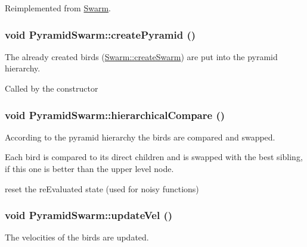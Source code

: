 Reimplemented from \hyperlink{classSwarm_4f31a2aeda867e79eab25b1a108f1c6f}{Swarm}.\hypertarget{classPyramidSwarm_23f4681fcd5ba0151ee4abc7c0143889}{
\subsubsection{\setlength{\rightskip}{0pt plus 5cm}void PyramidSwarm::createPyramid ()}}
\label{classPyramidSwarm_23f4681fcd5ba0151ee4abc7c0143889}


The already created birds (\hyperlink{classSwarm_1ba247983a6f20d0e835c696748a530b}{Swarm::createSwarm}) are put into the pyramid hierarchy. 

Called by the constructor \hypertarget{classPyramidSwarm_cd664c6c7399497eeb45aeade60835ab}{
\subsubsection{\setlength{\rightskip}{0pt plus 5cm}void PyramidSwarm::hierarchicalCompare ()}}
\label{classPyramidSwarm_cd664c6c7399497eeb45aeade60835ab}


According to the pyramid hierarchy the birds are compared and swapped. 

Each bird is compared to its direct children and is swapped with the best sibling, if this one is better than the upper level node. 

reset the reEvaluated state (used for noisy functions) \hypertarget{classPyramidSwarm_4f43e6459e6fede3785780facb4c5e1f}{
\subsubsection{\setlength{\rightskip}{0pt plus 5cm}void PyramidSwarm::updateVel ()}}
\label{classPyramidSwarm_4f43e6459e6fede3785780facb4c5e1f}


The velocities of the birds are updated. 

